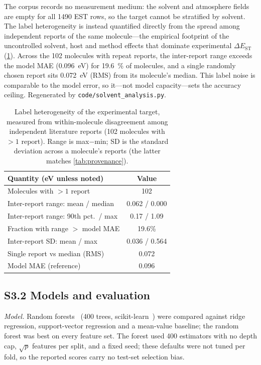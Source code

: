 \documentclass[twoside,twocolumn,9pt]{extarticle}
\begin{document}
The corpus records no measurement medium: the solvent and atmosphere fields are
empty for all \num{1490} EST rows, so the target cannot be stratified by solvent.
The label heterogeneity is instead quantified directly from the spread among
independent reports of the same molecule---the empirical footprint of the
uncontrolled solvent, host and method effects that dominate experimental
$\Delta E_\text{ST}$~\cite{Olivier2017} (\cref{tab:solvent}). Across the \num{102}
molecules with repeat reports, the inter-report range exceeds the model MAE
(\qty{0.096}{\electronvolt}) for \qty{19.6}{\percent} of molecules, and a single
randomly chosen report sits \qty{0.072}{\electronvolt} (RMS) from its molecule's
median. This label noise is comparable to the model error, so it---not model
capacity---sets the accuracy ceiling. Regenerated by
\texttt{code/solvent\_analysis.py}.

\begin{table}[htbp]
  \centering
  \caption{Label heterogeneity of the experimental target, measured from
    within-molecule disagreement among independent literature reports
    (\num{102} molecules with $>1$ report). Range is max$-$min; SD is the standard
    deviation across a molecule's reports (the latter matches \cref{tab:provenance}).}
  \label{tab:solvent}
  \footnotesize
  \begin{tabular}{lc}
    \toprule
    Quantity (eV unless noted) & Value \\
    \midrule
    Molecules with $>1$ report                 & 102 \\
    Inter-report range: mean / median          & 0.062 / 0.000 \\
    Inter-report range: 90th pct.\ / max       & 0.17 / 1.09 \\
    Fraction with range $>$ model MAE          & 19.6\% \\
    Inter-report SD: mean / max                & 0.036 / 0.564 \\
    Single report vs median (RMS)              & 0.072 \\
    \midrule
    Model MAE (reference)                      & 0.096 \\
    \bottomrule
  \end{tabular}
\end{table}

\subsection*{S3.2 Models and evaluation}
\emph{Model.} Random forests~\cite{Breiman2001} (\num{400} trees,
scikit-learn~\cite{Pedregosa2011}) were compared against ridge regression,
support-vector regression and a mean-value baseline; the random forest was best on
every feature set. The forest used \num{400} estimators with no depth cap, $\sqrt{p}$
features per split, and a fixed seed; these defaults were not tuned per fold, so the
reported scores carry no test-set selection bias.
\end{document}
